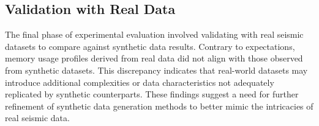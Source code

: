 \subsection{Validation with Real Data}


The final phase of experimental evaluation involved validating with real seismic datasets to compare against synthetic data results.
Contrary to expectations, memory usage profiles derived from real data did not align with those observed from synthetic datasets.
This discrepancy indicates that real-world datasets may introduce additional complexities or data characteristics not adequately replicated by synthetic counterparts.
These findings suggest a need for further refinement of synthetic data generation methods to better mimic the intricacies of real seismic data.
